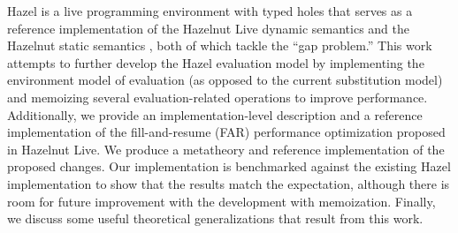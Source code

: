 
\noindent{}Hazel is a live programming environment with typed holes that serves as a reference implementation of the Hazelnut Live dynamic semantics \cite{/conf/popl/Hazelnut17} and the Hazelnut static semantics \cite{/conf/popl/HazelnutLive19}, both of which tackle the ``gap problem.'' This work attempts to further develop the Hazel evaluation model by implementing the environment model of evaluation (as opposed to the current substitution model) and memoizing several evaluation-related operations to improve performance. Additionally, we provide an implementation-level description and a reference implementation of the fill-and-resume (FAR) performance optimization proposed in Hazelnut Live. We produce a metatheory and reference implementation of the proposed changes. Our implementation is benchmarked against the existing Hazel implementation to show that the results match the expectation, although there is room for future improvement with the development with memoization. Finally, we discuss some useful theoretical generalizations that result from this work.

